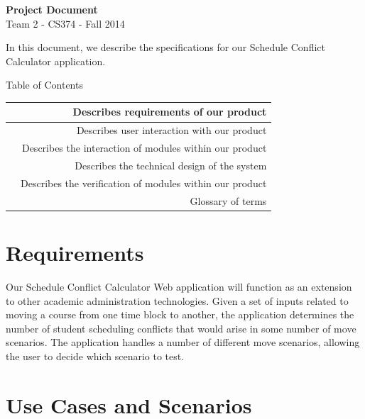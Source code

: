 \documentclass[11pt]{article}
\begin{document}
\begin{center}
\LARGE{\textbf{Project Document}}\\
\normalsize{Team 2 - CS374 - Fall 2014}
\end{center}
\vspace{.1in}

In this document, we describe the specifications for our Schedule Conflict Calculator application.
\vspace{.2in}

\LARGE Table of Contents \\

\normalsize
\begin{tabular}{| l || r |}
  \hline
  \nameref{sec:reqs} & Describes requirements of our product \\ \hline
  \nameref{sec:scenes} & Describes user interaction with our product \\ \hline
  \nameref{sec:dataflow} & Describes the interaction of modules within our product \\ \hline
  \nameref{sec:design} & Describes the technical design of the system \\ \hline
  \nameref{sec:verify} & Describes the verification of modules within our product \\ \hline
  \nameref{sec:glossary} & Glossary of terms \\
  \hline
\end{tabular}

\pagebreak[4]

\section{Requirements} \label{sec:reqs}

Our Schedule Conflict Calculator Web application will function as an extension to other academic administration technologies. Given
a set of inputs related to moving a course from one time block to another, the application determines the number of student
scheduling conflicts that would arise in some number of move scenarios. The application handles a number of different move
scenarios, allowing the user to decide which scenario to test.

\pagebreak[4]

\section{Use Cases and Scenarios} \label{sec:scenes}
\end{document}
